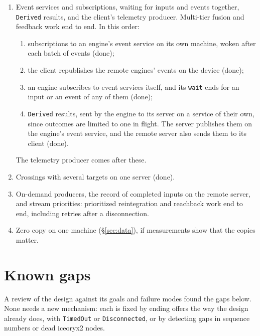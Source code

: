 \documentclass[11pt]{article}
\newcommand{\code}[1]{\texttt{#1}}
\begin{document}
\begin{enumerate}[nosep]
\begin{enumerate}[nosep]
                the bench can use on another machine. The analysis then
                compares no stamps across the two clocks
                (\S\ref{sec:remote}): the uplink and the return trip are
                reported together, as the link time (done).
        \end{enumerate}
  \item Event services and subscriptions, waiting for inputs and events
        together, \code{Derived} results, and the client's telemetry producer.
        Multi-tier fusion and feedback work end to end. In this order:
        \begin{enumerate}[nosep]
          \item subscriptions to an engine's event service on its own
                machine, woken after each batch of events (done);
          \item the client republishes the remote engines' events on the
                device (done);
          \item an engine subscribes to event services itself, and its
                \code{wait} ends for an input or an event of any of them
                (done);
          \item \code{Derived} results, sent by the engine to its server on a
                service of their own, since outcomes are limited to one in
                flight. The server publishes them on the engine's event
                service, and the remote server also sends them to its client
                (done).
        \end{enumerate}
        The telemetry producer comes after these.
  \item Crossings with several targets on one server (done).
  \item On-demand producers, the record of completed inputs on the remote
        server, and stream priorities: prioritized reintegration and
        reachback work end to end, including retries after a disconnection.
  \item Zero copy on one machine (\S\ref{sec:data}), if measurements show
        that the copies matter.
\end{enumerate}

\section{Known gaps}
\label{sec:gaps}

A review of the design against its goals and failure modes found the gaps
below. None needs a new mechanism: each is fixed by ending offers the way the
design already does, with \code{TimedOut} or \code{Disconnected}, or by
detecting gaps in sequence numbers or dead iceoryx2 nodes.
\end{document}
